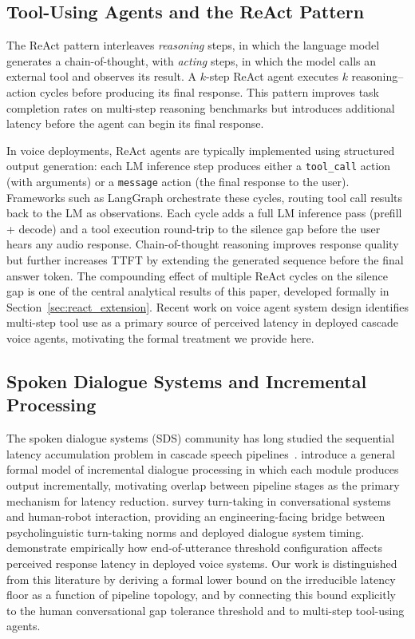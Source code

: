 \subsection{Tool-Using Agents and the ReAct Pattern}

The ReAct pattern \citep{yao2023react} interleaves \emph{reasoning} steps, in which the language
model generates a chain-of-thought, with \emph{acting} steps, in which the model calls an
external tool and observes its result.
A $k$-step ReAct agent executes $k$ reasoning--action cycles before producing its final response.
This pattern improves task completion rates on multi-step reasoning benchmarks
but introduces additional latency before the agent can begin its final response.

In voice deployments, ReAct agents are typically implemented using structured output generation:
each LM inference step produces either a \texttt{tool\_call} action (with arguments) or a
\texttt{message} action (the final response to the user).
Frameworks such as LangGraph \citep{langgraph2024} orchestrate these cycles,
routing tool call results back to the LM as observations.
Each cycle adds a full LM inference pass (prefill + decode) and a tool execution round-trip to the
silence gap before the user hears any audio response.
Chain-of-thought reasoning \citep{wei2023chainofthought} improves response quality but
further increases TTFT by extending the generated sequence before the final answer token.
The compounding effect of multiple ReAct cycles on the silence gap is one of the central
analytical results of this paper, developed formally in Section~\ref{sec:react_extension}.
Recent work on voice agent system design \citep{dong2024building} identifies multi-step
tool use as a primary source of perceived latency in deployed cascade voice agents,
motivating the formal treatment we provide here.

\subsection{Spoken Dialogue Systems and Incremental Processing}

The spoken dialogue systems (SDS) community has long studied the sequential latency accumulation problem in cascade speech pipelines~\citep{schlangen2011general,skantze2021turn}.
\citet{schlangen2011general} introduce a general formal model of incremental dialogue processing in which each module produces output incrementally, motivating overlap between pipeline stages as the primary mechanism for latency reduction.
\citet{skantze2021turn} survey turn-taking in conversational systems and human-robot interaction, providing an engineering-facing bridge between psycholinguistic turn-taking norms and deployed dialogue system timing.
\citet{raux2008optimizing} demonstrate empirically how end-of-utterance threshold configuration affects perceived response latency in deployed voice systems.
Our work is distinguished from this literature by deriving a formal lower bound on the irreducible latency floor as a function of pipeline topology, and by connecting this bound explicitly to the human conversational gap tolerance threshold and to multi-step tool-using agents.
